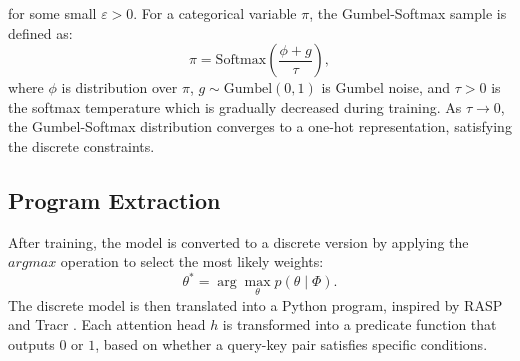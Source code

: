 \begin{itemize}
    for some small $\varepsilon > 0$. For a categorical variable \( \pi \), the Gumbel-Softmax sample is defined as:
    \[
    \pi = \text{Softmax}\left(\frac{\phi + g}{\tau}\right),
    \]
    where \(\phi\) is distribution over  \( \pi \), \( g \sim \text{Gumbel}(0, 1) \) is Gumbel noise, and \( \tau > 0 \) is the softmax temperature which is gradually decreased during training. As \( \tau \to 0 \), the Gumbel-Softmax distribution converges to a one-hot representation, satisfying the discrete constraints.
    
\end{itemize}

\subsection{Program Extraction}

After training, the model is converted to a discrete version by applying the $argmax$ operation to select the most likely weights:
\[
\theta^* = \arg\max_{\theta} p(\theta \mid \Phi).
\]
The discrete model is then translated into a Python program, inspired by RASP \cite{weiss2021thinking} and Tracr \cite{lindner2024tracr}. Each attention head \(h\) is transformed into a predicate function that outputs \(0\) or \(1\), based on whether a query-key pair satisfies specific conditions.

